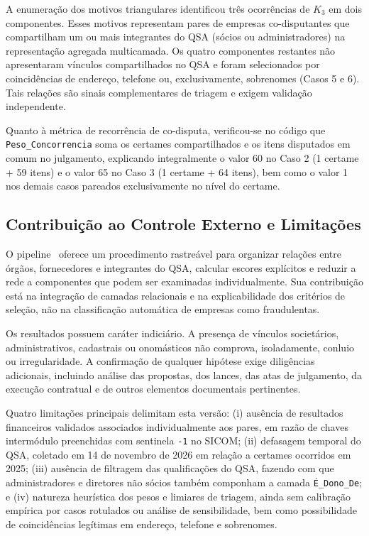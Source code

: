 A enumeração dos motivos triangulares identificou três ocorrências de $K_3$ em dois componentes. Esses motivos representam pares de empresas co-disputantes que compartilham um ou mais integrantes do QSA (sócios ou administradores) na representação agregada multicamada. Os quatro componentes restantes não apresentaram vínculos compartilhados no QSA e foram selecionados por coincidências de endereço, telefone ou, exclusivamente, sobrenomes (Casos 5 e 6). Tais relações são sinais complementares de triagem e exigem validação independente.

Quanto à métrica de recorrência de co-disputa, verificou-se no código que \texttt{Peso\_Concorrencia} soma os certames compartilhados e os itens disputados em comum no julgamento, explicando integralmente o valor 60 no Caso 2 (1 certame + 59 itens) e o valor 65 no Caso 3 (1 certame + 64 itens), bem como o valor 1 nos demais casos pareados exclusivamente no nível do certame.

\subsection{Contribuição ao Controle Externo e Limitações}

O pipeline~\cite{projeto_github} oferece um procedimento rastreável para organizar relações entre órgãos, fornecedores e integrantes do QSA, calcular escores explícitos e reduzir a rede a componentes que podem ser examinadas individualmente. Sua contribuição está na integração de camadas relacionais e na explicabilidade dos critérios de seleção, não na classificação automática de empresas como fraudulentas.

Os resultados possuem caráter indiciário. A presença de vínculos societários, administrativos, cadastrais ou onomásticos não comprova, isoladamente, conluio ou irregularidade. A confirmação de qualquer hipótese exige diligências adicionais, incluindo análise das propostas, dos lances, das atas de julgamento, da execução contratual e de outros elementos documentais pertinentes.

Quatro limitações principais delimitam esta versão: (i) ausência de resultados financeiros validados associados individualmente aos pares, em razão de chaves intermódulo preenchidas com sentinela \texttt{-1} no SICOM; (ii) defasagem temporal do QSA, coletado em 14 de novembro de 2026 em relação a certames ocorridos em 2025; (iii) ausência de filtragem das qualificações do QSA, fazendo com que administradores e diretores não sócios também componham a camada \texttt{É\_Dono\_De}; e (iv) natureza heurística dos pesos e limiares de triagem, ainda sem calibração empírica por casos rotulados ou análise de sensibilidade, bem como possibilidade de coincidências legítimas em endereço, telefone e sobrenomes.

